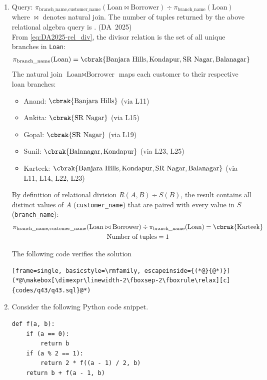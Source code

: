 \begin{enumerate}[label=\thesubsection.\arabic*, ref=\thesubsection.\theenumi]
\item 
\begin{figure}[H]
	\centering
	
	\caption{}
	\label{fig:DA-2025-43-1}
\end{figure}
Query: $\pi_{\text{branch\_name}, \text{customer\_name}}(\text{Loan} \bowtie \text{Borrower}) \div \pi_{\text{branch\_name}}(\text{Loan})$ where $\bowtie$ denotes natural join. The number of tuples returned by the above relational algebra query is \underline{\hspace{1.5cm}}.
\hfill (DA~2025)
\\
\solution
From \eqref{eq:DA2025-rel_div}, the divisor relation is the set of all unique branches in \texttt{Loan}:
\begin{align}
	\pi_{\text{branch\_name}}(\text{Loan}) &= \cbrak{\text{Banjara Hills}, \text{Kondapur}, \text{SR Nagar}, \text{Balanagar}}
\end{align}
The natural join $\text{Loan} \bowtie \text{Borrower}$ maps each customer to their respective loan branches:
\begin{itemize}
	\item Anand: $\cbrak{\text{Banjara Hills}}$ (via L11)
	\item Ankita: $\cbrak{\text{SR Nagar}}$ (via L15)
	\item Gopal: $\cbrak{\text{SR Nagar}}$ (via L19)
	\item Sunil: $\cbrak{\text{Balanagar}, \text{Kondapur}}$ (via L23, L25)
	\item Karteek: $\cbrak{\text{Banjara Hills}, \text{Kondapur}, \text{SR Nagar}, \text{Balanagar}}$ (via L11, L14, L22, L23)
\end{itemize}
By definition of relational division $R(A, B) \div S(B)$, the result contains all distinct values of $A$ (\texttt{customer\_name}) that are paired with every value in $S$ (\texttt{branch\_name}):
\begin{gather}
	\pi_{\text{branch\_name}, \text{customer\_name}}(\text{Loan} \bowtie \text{Borrower}) \div \pi_{\text{branch\_name}}(\text{Loan}) = \cbrak{\text{Karteek}}
	\\
	\text{Number of tuples} = 1
\end{gather}

The following code verifies the solution
\begin{lstlisting}[frame=single, basicstyle=\rmfamily, escapeinside={(*@}{@*)}]
(*@\makebox[\dimexpr\linewidth-2\fboxsep-2\fboxrule\relax][c]{codes/q43/q43.sql}@*)
\end{lstlisting}
\item 
Consider the following Python code snippet.
\begin{lstlisting}[frame=single, basicstyle=\rmfamily, xleftmargin=0pt]
def f(a, b):
	if (a == 0):
		return b
	if (a % 2 == 1):
		return 2 * f((a - 1) / 2, b)
	return b + f(a - 1, b)
	

\end{lstlisting}
\end{enumerate}
